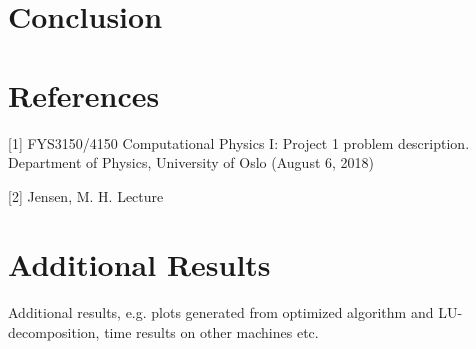\documentclass[12pt]{article}
\renewcommand \thesection{\arabic{section}.}
\numberwithin{equation}{section}     %
\begin{document}
\section{Conclusion}

\newpage
\section*{References}

[1] FYS3150/4150 Computational Physics I: Project 1 problem description. Department of Physics, University of Oslo (August 6, 2018)

[2] Jensen, M. H. Lecture


\newpage
\appendix
\renewcommand\thesection{Appendix \Alph{section}:}
\section{Additional Results}

Additional results, e.g. plots generated from optimized algorithm and LU-decomposition, time results on other machines etc.
\end{document}
